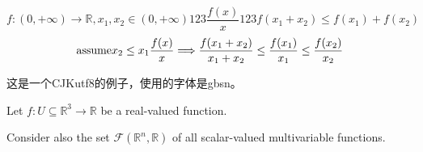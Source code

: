 \documentclass[12pt]{report}
\begin{document}
$$
f:\left(0,+\infty\right) \to \mathbb{R}, x_1, x_2 \in \left(0,+\infty\right) \mbox{123}
\frac{f(x)}{x}  \mbox{123} f(x_1+x_2) \leq f(x_1) + f(x_2)
$$
$$
\mbox{assume} x_2\leq x_1
\\
\frac{f(x)}{x} \Longrightarrow \frac{f(x_1+x_2)}{x_1+x_2} \leq \frac{f(x_1)}{x_1}\leq\frac{f(x_2)}{x_2}
$$

\begin{CJK}{UTF8}{gbsn}
    这是一个CJKutf8的例子，使用的字体是gbsn。
\end{CJK}

Let $f:U\subseteq \mathbb{R}^{3} \to \mathbb{R}$ be a real-valued function.

Consider also the set $\mathcal{F}(\mathbb{R}^{n},\mathbb{R})$ of all scalar-valued multivariable functions.
\end{document}

